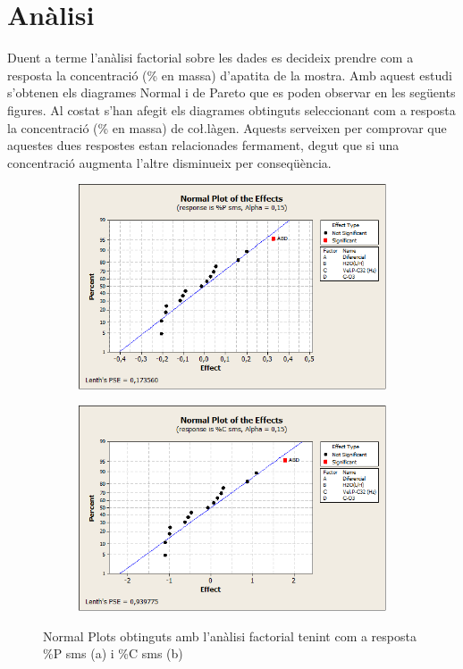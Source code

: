 \documentclass[a4paper]{article}
\begin{document}
\section{Anàlisi}
Duent a terme l’anàlisi factorial sobre les dades es decideix prendre com a resposta la concentració (\% en massa) d’apatita de la mostra. Amb aquest estudi s’obtenen els diagrames Normal i de Pareto que es poden observar en les següents figures. Al costat s’han afegit els diagrames obtinguts seleccionant com a resposta la concentració (\% en massa) de co\l.làgen. Aquests serveixen per comprovar que aquestes dues respostes estan relacionades fermament, degut que si una concentració augmenta l’altre disminueix per conseqüència.
\begin{figure}[H]
	\begin{subfigure}{.5\textwidth}
		\centering
		\includegraphics[width=.8\linewidth]{images/NormalEffects15P}
		\caption{}
		\label{fig:NormalEffects15P}
	\end{subfigure}%
	\begin{subfigure}{.5\textwidth}
		\centering
		\includegraphics[width=.8\linewidth]{images/NormalEffects15C}
		\caption{}
		\label{fig:NormalEffects15C}
	\end{subfigure}
	\caption{Normal Plots obtinguts amb l’anàlisi factorial tenint com a resposta \%P sms (a) i \%C sms (b)}
	\label{fig:NormalEffects15}
\end{figure}
\end{document}
